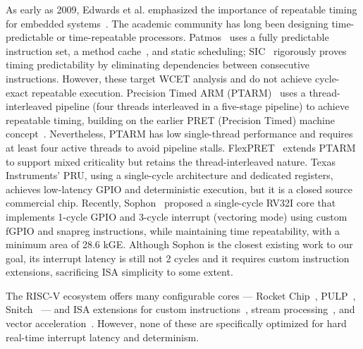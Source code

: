 \documentclass[letterpaper,journal]{IEEEtran}
\begin{document}
As early as 2009, Edwards et al. emphasized the importance of repeatable timing for embedded systems~\cite{ref19}.
The academic community has long been designing time-predictable or time-repeatable processors.
Patmos~\cite{ref8} uses a fully predictable instruction set, a method cache~\cite{ref9}, and static scheduling; SIC~\cite{ref3} rigorously proves timing predictability by eliminating dependencies between consecutive instructions.
However, these target WCET analysis and do not achieve cycle-exact repeatable execution.
Precision Timed ARM (PTARM)~\cite{ref2} uses a thread-interleaved pipeline (four threads interleaved in a five-stage pipeline) to achieve repeatable timing, building on the earlier PRET (Precision Timed) machine concept~\cite{ref20}.
Nevertheless, PTARM has low single-thread performance and requires at least four active threads to avoid pipeline stalls.
FlexPRET~\cite{ref12} extends PTARM to support mixed criticality but retains the thread-interleaved nature.
Texas Instruments' PRU, using a single-cycle architecture and dedicated registers, achieves low-latency GPIO and deterministic execution, but it is a closed source commercial chip.
Recently, Sophon~\cite{ref1} proposed a single-cycle RV32I core that implements 1-cycle GPIO and 3-cycle interrupt (vectoring mode) using custom fGPIO and snapreg instructions, while maintaining time repeatability, with a minimum area of 28.6 kGE.
Although Sophon is the closest existing work to our goal, its interrupt latency is still not 2 cycles and it requires custom instruction extensions, sacrificing ISA simplicity to some extent.

The RISC-V ecosystem offers many configurable cores --- Rocket Chip~\cite{ref13}, PULP~\cite{ref14}, Snitch~\cite{ref15} --- and ISA extensions for custom instructions~\cite{ref21,ref22}, stream processing~\cite{ref23}, and vector acceleration~\cite{ref25}.
However, none of these are specifically optimized for hard real-time interrupt latency and determinism.
\end{document}
